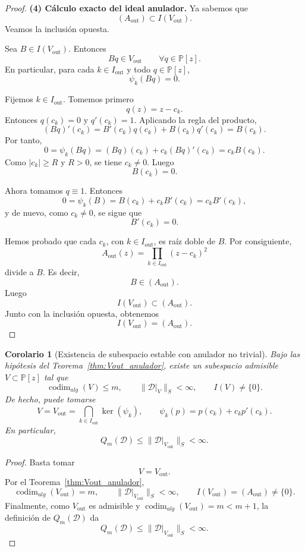 \documentclass[12pt,a4paper]{article}
\newtheorem{corollary}{Corolario}
\theoremstyle{definition}
\theoremstyle{remark}
\begin{document}
\begin{proof}
	\medskip
	\textbf{(4) Cálculo exacto del ideal anulador.}
	Ya sabemos que
	\[
		(A_{\mathrm{out}})\subset I(V_{\mathrm{out}}).
	\]
	Veamos la inclusión opuesta.

	Sea $B\in I(V_{\mathrm{out}})$. Entonces
	\[
		Bq\in V_{\mathrm{out}}
		\qquad \forall q\in\mathbb P[z].
	\]
	En particular, para cada $k\in I_{\mathrm{out}}$ y todo $q\in\mathbb P[z]$,
	\[
		\psi_k(Bq)=0.
	\]

	Fijemos $k\in I_{\mathrm{out}}$. Tomemos primero
	\[
		q(z)=z-c_k.
	\]
	Entonces $q(c_k)=0$ y $q'(c_k)=1$. Aplicando la regla del producto,
	\[
		(Bq)'(c_k)=B'(c_k)q(c_k)+B(c_k)q'(c_k)=B(c_k).
	\]
	Por tanto,
	\[
		0=\psi_k(Bq)=(Bq)(c_k)+c_k(Bq)'(c_k)=c_kB(c_k).
	\]
	Como $|c_k|\ge R$ y $R>0$, se tiene $c_k\neq 0$. Luego
	\[
		B(c_k)=0.
	\]

	Ahora tomamos $q\equiv 1$. Entonces
	\[
		0=\psi_k(B)=B(c_k)+c_kB'(c_k)=c_kB'(c_k),
	\]
	y de nuevo, como $c_k\neq 0$, se sigue que
	\[
		B'(c_k)=0.
	\]

	Hemos probado que cada $c_k$, con $k\in I_{\mathrm{out}}$, es raíz doble de $B$.
	Por consiguiente,
	\[
		A_{\mathrm{out}}(z)=\prod_{k\in I_{\mathrm{out}}}(z-c_k)^2
	\]
	divide a $B$. Es decir,
	\[
		B\in (A_{\mathrm{out}}).
	\]
	Luego
	\[
		I(V_{\mathrm{out}})\subset (A_{\mathrm{out}}).
	\]
	Junto con la inclusión opuesta, obtenemos
	\[
		I(V_{\mathrm{out}})=(A_{\mathrm{out}}).
	\]
\end{proof}

\begin{corollary}[Existencia de subespacio estable con anulador no trivial]
	\label{cor:existencia_V_estable_anulador}
	Bajo las hipótesis del Teorema~\ref{thm:Vout_anulador}, existe un subespacio admisible
	$V\subset \mathbb P[z]$ tal que
	\[
		\operatorname{codim}_{alg}(V)\le m,
		\qquad
		\|\mathcal D|_V\|_S<\infty,
		\qquad
		I(V)\neq \{0\}.
	\]
	De hecho, puede tomarse
	\[
		V=V_{\mathrm{out}}=\bigcap_{k\in I_{\mathrm{out}}}\ker(\psi_k),
		\qquad
		\psi_k(p)=p(c_k)+c_kp'(c_k).
	\]
	En particular,
	\[
		Q_m(\mathcal D)\le \|\mathcal D|_{V_{\mathrm{out}}}\|_S<\infty.
	\]
\end{corollary}

\begin{proof}
	Basta tomar
	\[
		V=V_{\mathrm{out}}.
	\]
	Por el Teorema~\ref{thm:Vout_anulador},
	\[
		\operatorname{codim}_{alg}(V_{\mathrm{out}})=m,
		\qquad
		\|\mathcal D|_{V_{\mathrm{out}}}\|_S<\infty,
		\qquad
		I(V_{\mathrm{out}})=(A_{\mathrm{out}})\neq\{0\}.
	\]
	Finalmente, como $V_{\mathrm{out}}$ es admisible y $\operatorname{codim}_{alg}(V_{\mathrm{out}})=m< m+1$,
	la definición de $Q_m(\mathcal D)$ da
	\[
		Q_m(\mathcal D)\le \|\mathcal D|_{V_{\mathrm{out}}}\|_S<\infty.
	\]
\end{proof}
\end{document}
